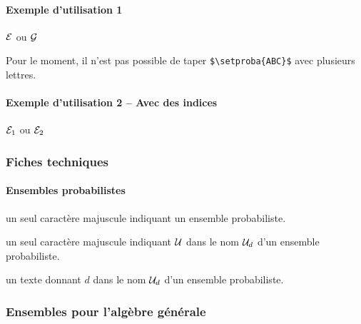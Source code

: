 \documentclass[12pt,a4paper]{article}
\begin{document}
\paragraph{Exemple d'utilisation 1}

\begin{latexex}
$\setproba{E}$ ou
$\setproba{G}$
\end{latexex}

\begin{remark}
	Pour le moment, il n'est pas possible de taper \verb+$\setproba{ABC}$+ avec plusieurs lettres.
\end{remark}




\paragraph{Exemple d'utilisation 2 -- Avec des indices}

\begin{latexex}
$\setproba*{E}{1}$ ou
$\setproba*{E}{2}$
\end{latexex}




\subsubsection{Fiches techniques}

\paragraph{Ensembles probabilistes}


\IDarg{} un seul caractère \ascii{} majuscule indiquant un ensemble probabiliste.


\separation



 un seul caractère \ascii{} majuscule indiquant $\setproba{U}$ dans le nom $\setproba*{U}{d}$ d'un ensemble probabiliste.

 un texte donnant $d$ dans le nom $\setproba*{U}{d}$ d'un ensemble probabiliste.




\subsubsection{Ensembles pour l'algèbre générale}
\end{document}
